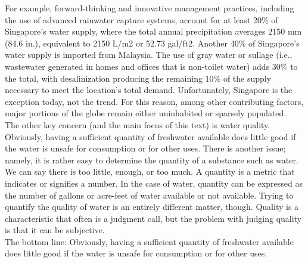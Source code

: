 \documentclass{article}
\begin{document}
For example, forward-thinking and innovative management
practices, including the use of advanced rainwater capture systems, account
for at least 20\% of Singapore’s water supply, where the total annual precipitation
averages 2150 mm (84.6 in.), equivalent to 2150 L/m2 or 52.73 gal/ft2. Another 40\%
of Singapore’s water supply is imported from Malaysia. The use of gray water or
sullage (i.e., wastewater generated in homes and offices that is non-toilet water) adds
30\% to the total, with desalinization producing the remaining 10\% of the supply
necessary to meet the location’s total demand. Unfortunately, Singapore is the exception
today, not the trend. For this reason, among other contributing factors, major
portions of the globe remain either uninhabited or sparsely populated.\\

The other key concern (and the main focus of this text) is water quality. Obviously,
having a sufficient quantity of freshwater available does little good if the water is
unsafe for consumption or for other uses. There is another issue; namely, it is rather
easy to determine the quantity of a substance such as water. We can say there is
too little, enough, or too much. A quantity is a metric that indicates or signifies a
number. In the case of water, quantity can be expressed as the number of gallons or
acre-feet of water available or not available. Trying to quantify the quality of water
is an entirely different matter, though. Quality is a characteristic that often is a judgment
call, but the problem with judging quality is that it can be subjective.\\

The bottom line: Obviously, having a sufficient quantity of freshwater available
does little good if the water is unsafe for consumption or for other uses.\\
\end{document}
